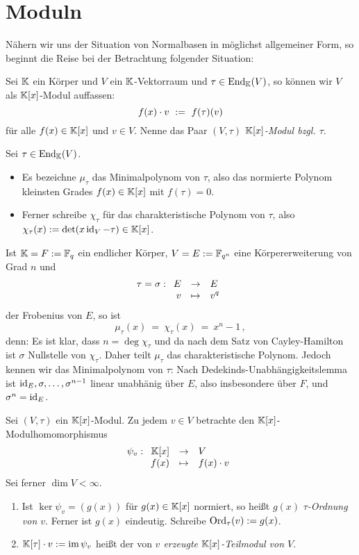 \chapter{Moduln}

Nähern wir uns der Situation von Normalbasen in möglichst allgemeiner Form, so
beginnt die Reise bei der Betrachtung folgender Situation:
\begin{definition}[$(V,\tau)$]
  Sei $\mathbb{K}$ ein Körper und $V$ ein $\mathbb{K}$-Vektorraum und 
  $\tau \in \operatorname{End}_\mathbb{K}(V)$, so können wir $V$ als $\mathbb{K}[x]$-Modul auffassen:
  \[ f(x) \cdot v \ :=\  f(\tau)(v)\]
  für alle $f(x) \in \mathbb{K}[x]$ und $v\in V$.
  Nenne das Paar $(V,\tau)$ \emph{$\mathbb{K}[x]$-Modul bzgl. $\tau$}.
\end{definition}

\begin{notation}
  Sei $\tau\in \operatorname{End}_\mathbb{K}(V)$.
  \begin{itemize}
  \item Es bezeichne $\mu_\tau$ das Minimalpolynom von 
    $\tau$, also das normierte Polynom kleinsten Grades $f(x)\in \mathbb{K}[x]$ mit 
    $f(\tau) = 0$.
  \item Ferner schreibe $\chi_\tau$ für das charakteristische Polynom von 
    $\tau$, also $\chi_\tau(x) := \det(x \operatorname{id}_V - \tau) \in \mathbb{K}[x]$.
  \end{itemize}
\end{notation}


\begin{bemerkung}
  Ist $\mathbb{K}  = F :=\mathbb{F}_q$ ein endlicher Körper, 
  $V = E := \mathbb{F}_{q^n}$ eine Körpererweiterung
  von Grad $n$ und 
  \[\tau = \sigma: \funcdef{E & \to & E\\
    v &\mapsto & v^q}\]
  der Frobenius von $E$, so ist
  \[ \mu_\tau(x) \ =\ \chi_\tau(x) \ =\ x^n - 1\,,\]
  denn: Es ist klar, dass $n = \deg \chi_\tau$ und da nach dem Satz von
  Cayley-Hamilton ist $\sigma$ Nullstelle von $\chi_\tau$. Daher teilt
  $\mu_\tau$ das charakteristische Polynom. Jedoch kennen wir das
  Minimalpolynom von $\tau$: Nach Dedekinds-Unabhängigkeitslemma ist 
  $\operatorname{id}_E,\sigma,\ldots,\sigma^{n-1}$ linear unabhänig über $E$, also insbesondere
  über $F$, und $\sigma^n = \operatorname{id}_E$.
\end{bemerkung}


\begin{definition}
  Sei $(V,\tau)$ ein $\mathbb{K}[x]$-Modul. Zu jedem $v \in V$ betrachte den
  $\mathbb{K}[x]$-Modulhomomorphismus
  \[ \psi_v: \funcdef{\K[x] & \to & V \\
    f(x) & \mapsto & f(x)\cdot v }  \]
  Sei ferner $\dim V < \infty$.
  \begin{enumerate}
    \item Ist $\ker\psi_v = (g(x))$ für $g(x)\in \mathbb{K}[x]$ normiert, so heißt
      $g(x)$ \emph{$\tau$-Ordnung von $v$}\@. Ferner ist $g(x)$ eindeutig.
      Schreibe $\operatorname{Ord}_\tau(v) := g(x)$.
    \item $\mathbb{K}[\tau]\cdot v := \operatorname{im}{\psi_v}$ heißt der von \emph{$v$ erzeugte
      $\mathbb{K}[x]$-Teilmodul von $V$}.
  \end{enumerate}
\end{definition}


